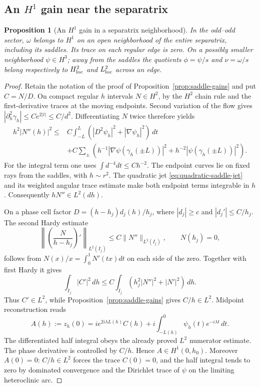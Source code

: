 \documentclass[reqno,11pt]{amsart}
\numberwithin{equation}{section}
\newtheorem{proposition}[theorem]{Proposition}
\theoremstyle{remark}
\begin{document}
\subsection{An $H^1$ gain near the separatrix}

\begin{proposition}[An $H^1$ gain in a separatrix neighborhood]
\label{prop:separatrix-h1}
In the odd--odd sector, $\omega$ belongs to $H^1$ on an open
neighborhood of the entire separatrix, including its saddles.
Its trace on each regular edge is zero.  On a possibly smaller
neighborhood $\psi\in H^3$; away from the saddles the quotients
$\phi=\psi/s$ and $\nu=\omega/s$ belong respectively to
$H^2_{\rm loc}$ and $L^2_{\rm loc}$ across an edge.
\end{proposition}

\begin{proof}
Retain the notation of the proof of
Proposition~\ref{prop:saddle-gains} and put $C=N/D$.
On compact regular $h$ intervals $N\in H^2$, by the $H^2$
chain rule and the first-derivative traces at the moving endpoints.
Second variation of the flow gives
$|\partial_h^2\gamma_h|\leq Ce^{2|t|}\leq C/d^2$.
Differentiating $N$ twice therefore yields
\begin{align*}
 h^2|N''(h)|^2\leq {}&
 C\int_{-L}^L(|D^2\psi_h|^2+|\nabla\psi_h|^2)\,dt\\
 &+C\sum_{\pm}\left(
 h^{-1}|\nabla\psi(\gamma_h(\pm L))|^2
 +h^{-2}|\psi(\gamma_h(\pm L))|^2\right).
\end{align*}
For the integral term one uses $\int d^{-4}dt\leq Ch^{-2}$.
The endpoint curves lie on fixed rays from the saddles, with
$h\sim r^2$.  The quadratic jet \eqref{eq:quadratic-saddle-jet}
and its weighted angular trace
estimate make both endpoint terms integrable in $h$.
Consequently $hN''\in L^2(dh)$.

On a phase cell factor $D=(h-h_j)d_j(h)/h_j$, where
$|d_j|\geq c$ and $|d_j'|\leq C/h_j$.
The second Hardy estimate
\[
 \left\|\left(\frac{N}{h-h_j}\right)'\right\|_{L^2(I_j)}
 \leq C\|N''\|_{L^2(I_j)},\qquad N(h_j)=0,
\]
follows from $N(x)/x=\int_0^1N'(tx)dt$ on each side of the zero.
Together with first Hardy it gives
\[
 \int_{I_j}|C'|^2\,dh
 \leq C\int_{I_j}(h_j^2|N''|^2+|N'|^2)\,dh.
\]
Thus $C'\in L^2$, while Proposition~\ref{prop:saddle-gains} gives
$C/h\in L^2$.  Midpoint reconstruction reads
\[
 A(h):=z_h(0)=ie^{2i\lambda L(h)}C(h)
        +i\int_{-L(h)}^0\psi_h(t)e^{-i\lambda t}\,dt.
\]
The differentiated half integral obeys the already proved
$L^2$ numerator estimate.  The phase derivative is controlled by
$C/h$.  Hence $A\in H^1(0,h_0)$.  Moreover $A(0)=0$:
$C/h\in L^2$ forces the trace $C(0)=0$, and the half integral
tends to zero by dominated convergence and the Dirichlet trace
of $\psi$ on the limiting heteroclinic arc.


\end{proof}
\end{document}
